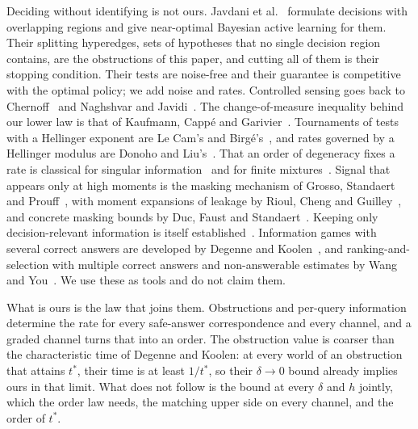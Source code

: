 Deciding without identifying is not ours. Javdani et al.~\cite{javdani2014} formulate decisions
with overlapping regions and give near-optimal Bayesian active learning for them. Their
splitting hyperedges, sets of hypotheses that no single decision region contains, are the
obstructions of this paper, and cutting all of them is their stopping condition. Their tests are
noise-free and their guarantee is competitive with the optimal policy; we add noise and rates.
Controlled sensing goes back to Chernoff~\cite{chernoff1959} and Naghshvar and
Javidi~\cite{naghshvar2013}. The change-of-measure inequality behind our lower law is that of
Kaufmann, Capp\'e and Garivier~\cite{kaufmann2016}. Tournaments of tests with a Hellinger
exponent are Le Cam's and Birg\'e's~\cite{lecam1973,birge1983}, and rates governed by a Hellinger
modulus are Donoho and Liu's~\cite{donoho1991}. That an order of degeneracy fixes a rate is
classical for singular information~\cite{rotnitzky2000} and for finite
mixtures~\cite{heinrich2018,honguyen2015}. Signal that
appears only at high moments is the masking mechanism of Grosso, Standaert and
Prouff~\cite{grosso2014}, with moment expansions of leakage by Rioul, Cheng and
Guilley~\cite{rioul2021}, and concrete masking bounds by Duc, Faust and Standaert~\cite{duc2015}.
Keeping only decision-relevant information is itself established~\cite{poli2023}. Information
games with several correct answers are developed by Degenne and Koolen~\cite{degenne2019}, and
ranking-and-selection with multiple correct answers and non-answerable estimates by Wang and
You~\cite{wangyou2026}. We use these as tools and do not claim them.

What is ours is the law that joins them. Obstructions and per-query information determine the
rate for every safe-answer correspondence and every channel, and a graded channel turns that
into an order. The obstruction value is coarser than the characteristic time of Degenne and
Koolen: at every world of an obstruction that attains $t^{*}$, their time is at least $1/t^{*}$,
so their $\delta\to0$ bound already implies ours in that limit. What does not follow is the
bound at every $\delta$ and $h$ jointly, which the order law needs, the matching upper side on
every channel, and the order of $t^{*}$.

